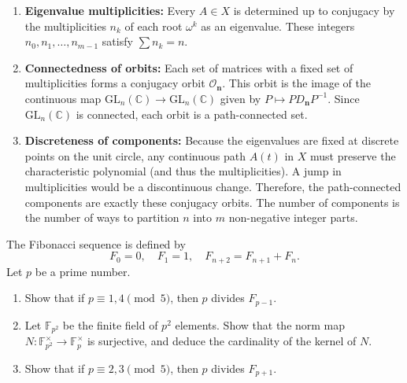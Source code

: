 \begin{solution}
\begin{enumerate}
    \item \textbf{Eigenvalue multiplicities:} Every $A \in X$ is determined up to conjugacy by the multiplicities $n_k$ of each root $\omega^k$ as an eigenvalue. These integers $n_0, n_1, \dots, n_{m-1}$ satisfy $\sum n_k = n$.

    \item \textbf{Connectedness of orbits:} Each set of matrices with a fixed set of multiplicities forms a conjugacy orbit $\mathcal{O}_{\mathbf{n}}$. This orbit is the image of the continuous map $\mathrm{GL}_n(\mathbb{C}) \to \mathrm{GL}_n(\mathbb{C})$ given by $P \mapsto P D_{\mathbf{n}} P^{-1}$. Since $\mathrm{GL}_n(\mathbb{C})$ is connected, each orbit is a path-connected set.

    \item \textbf{Discreteness of components:} Because the eigenvalues are fixed at discrete points on the unit circle, any continuous path $A(t)$ in $X$ must preserve the characteristic polynomial (and thus the multiplicities). A jump in multiplicities would be a discontinuous change. Therefore, the path-connected components are exactly these conjugacy orbits. The number of components is the number of ways to partition $n$ into $m$ non-negative integer parts.
\end{enumerate}
\end{solution}

\begin{exercise}
\label{algebra:2019:5}
The Fibonacci sequence is defined by
\[
F_0 = 0, \quad F_1 = 1, \quad F_{n+2} = F_{n+1} + F_n.
\]
Let $p$ be a prime number.

\begin{enumerate}
    \item Show that if $p \equiv 1, 4 \pmod{5}$, then $p$ divides $F_{p-1}$.
    \item Let $\mathbb{F}_{p^2}$ be the finite field of $p^2$ elements. Show that the norm map $N: \mathbb{F}_{p^2}^\times \to \mathbb{F}_p^\times$ is surjective, and deduce the cardinality of the kernel of $N$.
    \item Show that if $p \equiv 2, 3 \pmod{5}$, then $p$ divides $F_{p+1}$.
\end{enumerate}
\end{exercise}


